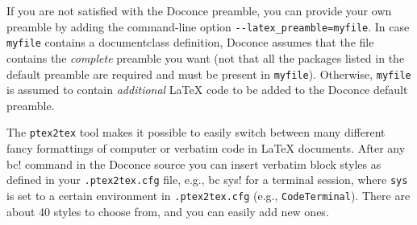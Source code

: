 \documentclass[%
oneside,                 %
final,                   %
10pt]{article}
\begin{document}
\noindent
If you are not satisfied with the Doconce preamble, you can provide
your own preamble by adding the command-line option {\fontsize{10pt}{10pt}\Verb!--latex_preamble=myfile!}.
In case {\fontsize{10pt}{10pt}\Verb!myfile!} contains a documentclass definition, Doconce assumes
that the file contains the \emph{complete} preamble you want (not that all
the packages listed in the default preamble are required and must be
present in {\fontsize{10pt}{10pt}\Verb!myfile!}). Otherwise, {\fontsize{10pt}{10pt}\Verb!myfile!} is assumed to contain
\emph{additional} {\LaTeX} code to be added to the Doconce default preamble.

The {\fontsize{10pt}{10pt}\Verb!ptex2tex!} tool makes it possible to easily switch between many
different fancy formattings of computer or verbatim code in {\LaTeX}
documents. After any {\fontsize{10pt}{10pt}\Verb!!bc!} command in the Doconce source you can
insert verbatim block styles as defined in your {\fontsize{10pt}{10pt}\Verb!.ptex2tex.cfg!}
file, e.g., {\fontsize{10pt}{10pt}\Verb!!bc sys!} for a terminal session, where {\fontsize{10pt}{10pt}\Verb!sys!} is set to
a certain environment in {\fontsize{10pt}{10pt}\Verb!.ptex2tex.cfg!} (e.g., {\fontsize{10pt}{10pt}\Verb!CodeTerminal!}).
There are about 40 styles to choose from, and you can easily add
new ones.
\end{document}

